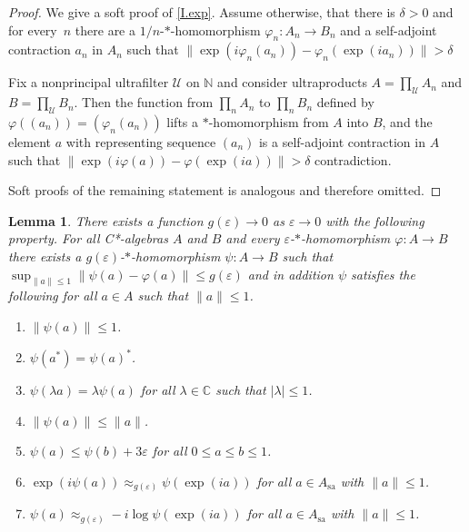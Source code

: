 \documentclass[11pt]{amsproc}
\newcommand{\bbN}{\mathbb N}
\newcommand{\cstar}{C*}
\newcommand{\bbC}{\mathbb C}
\newcommand{\cU}{\mathcal U}
\theoremstyle{definition}
\theoremstyle{plain}
\newtheorem{lemma}[definition]{Lemma}
\theoremstyle{remark}
\begin{document}
\begin{proof}
	We give a soft proof of \eqref{I.exp}. 
	Assume otherwise, that there is $\delta>0$ and for every~$n$ there are a $1/n$-$*$-homomorphism $\varphi_n\colon A_n\to B_n$ and a self-adjoint contraction $a_n$ in $A_n$ such that 
	$\|\exp(i\varphi_n(a_n))-\varphi_n(\exp(i a_n))\|>\delta$
	
	Fix a nonprincipal ultrafilter $\cU$ on $\bbN$ and consider ultraproducts  $A=\prod_\cU A_n$ and $B=\prod_\cU B_n$. Then the function from $\prod_n A_n$ to $\prod_n B_n$ defined by  $\varphi((a_n))=(\varphi_n(a_n))$ lifts a $*$-homomorphism from $A$ into $B$, and 
	the element $a$ with representing sequence $(a_n)$ is a self-adjoint contraction in $A$ such that $\|\exp(i\varphi(a))-\varphi(\exp(i a))\|>\delta$ contradiction. 
	
	Soft proofs of the remaining statement is analogous and therefore omitted. 
\end{proof}

\begin{lemma}\label{L.Corrected}
		There exists a function $g(\varepsilon)\to 0$ as $\varepsilon\to 0$ with the following property. For all \cstar-algebras $A$ and $B$ and every $\varepsilon$-$*$-homomorphism $\varphi\colon A\to B$ 
 there exists a $g(\varepsilon)$-$*$-homomorphism $\psi\colon A\to B$ such that $\sup_{\|a\|\leq 1} \|\psi(a)-\varphi(a)\| \leq g(\varepsilon)$ and in addition $\psi$ satisfies the following for all $a\in A$ such that  $\|a\|\leq 1$. 
\begin{enumerate}
	\item\label{a.Corrected.norm} $\|\psi(a)\|\leq 1$. 
	\item \label{a.Corrected.*} $\psi(a^*)=\psi(a)^*$. 
	\item \label{a.Corrected.scalar} $\psi(\lambda a)=\lambda \psi(a)$ for all $\lambda\in \bbC$ such that $|\lambda|\leq 1$. 
	\item \label{a.Corrected.ctns}$\|\psi(a)\|\leq \|a\|$. 
	\item \label{a.Corrected.leq} $\psi(a)\leq \psi(b)+3\varepsilon$ for all $0\leq a\leq b\leq 1$. 
			\item \label{a.Corrected.exp} $\exp(i\psi(a))\approx_{g(\varepsilon )}\psi(\exp(i a))$ for all $a\in A_{\textrm{sa}}$ with $\|a\|\leq 1$. 
	\item \label{a.Corrected.log} $\psi(a)\approx_{g(\varepsilon)} -i \log \psi(\exp(ia))$ for all $a\in A_{\textrm{sa}}$ with $\|a\|\leq 1$.
\end{enumerate}
\end{lemma}
\end{document}
